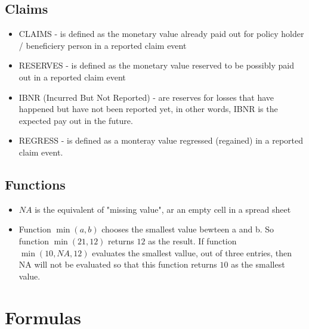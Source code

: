 \documentclass[11pt,a4paper,fleqn]{article}      %
\begin{document}
\subsection{Claims}

\begin{itemize}
\item CLAIMS - is defined as the monetary value already paid out for policy holder / beneficiery person in a reported claim event
\item RESERVES - is defined as the monetary value reserved to be possibly paid out in a reported claim event
\item IBNR (Incurred But Not Reported) - are reserves for losses that have happened but have not been reported yet, in other words, IBNR is the expected pay out in the future.
\item REGRESS - is defined as a monteray value regressed (regained) in a reported claim event.
\end{itemize}

\subsection{Functions}
\label{sec:funct}

\begin{itemize}
\item $NA$ is the equivalent of "missing value", ar an empty cell in a spread sheet
\item Function $\min(a,b)$ chooses the smallest value bewteen a and b. So function $\min(21,12)$ returns $12$ as the result. If function $\min(10,NA,12)$ evaluates the smallest vallue, out of three entries, then NA will not be evaluated so that this function returns $10$ as the smallest value. 
\end{itemize}


\section{Formulas}
\end{document}

